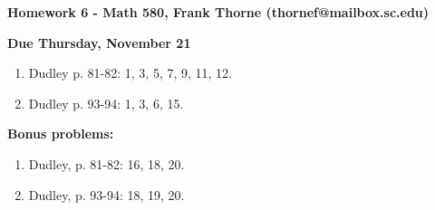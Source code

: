 \documentclass[12pt]{article}
\begin{document}
\setlength{\topmargin}{-2mm}





\begin{center}{\bf Homework 6 - Math 580, Frank Thorne (thornef@mailbox.sc.edu)}
\end{center}
\begin{center}
{\bf Due Thursday, November 21}
\end{center}
\begin{enumerate}[(1)]
\item
Dudley p. 81-82: 1, 3, 5, 7, 9, 11, 12.
\item
Dudley p. 93-94: 1, 3, 6, 15.
\end{enumerate}

{\bf Bonus problems:}
\begin{enumerate}[(1)]
\item
Dudley, p. 81-82: 16, 18, 20.
\item
Dudley, p. 93-94: 18, 19, 20.
\end{enumerate}
\end{document}
